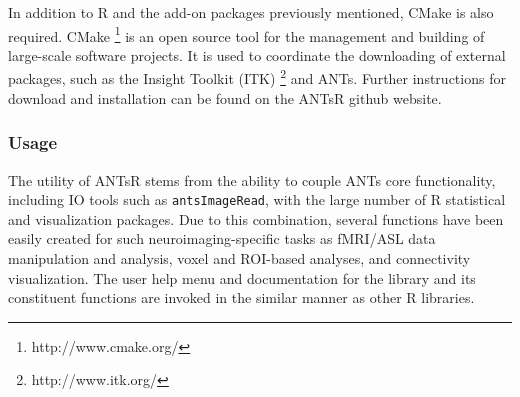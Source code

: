 \documentclass[final,5p,times,twocolumn]{elsarticle}
\begin{document}
In addition to R and the add-on packages previously mentioned, CMake is also 
required.  CMake%
\footnote{
http://www.cmake.org/
}
is an open source tool for the management and building of 
large-scale software projects.  It is used
to coordinate the downloading of external packages,
such as the Insight Toolkit (ITK)%
\footnote{
http://www.itk.org/
}
and ANTs.  Further instructions for download and
installation can be found on the ANTsR github website.

\subsubsection{Usage}
The utility of ANTsR stems from the ability to couple ANTs core 
functionality, including IO tools such as \verb#antsImageRead#, 
with the large number of R statistical and
visualization packages.  Due to this combination, several
functions have been easily created for such neuroimaging-specific 
tasks as fMRI/ASL data manipulation and analysis,
voxel and ROI-based  analyses,
and connectivity visualization. %
The user help menu and documentation for the library  and its
constituent functions are invoked in the similar manner as other
R libraries.
\end{document}
